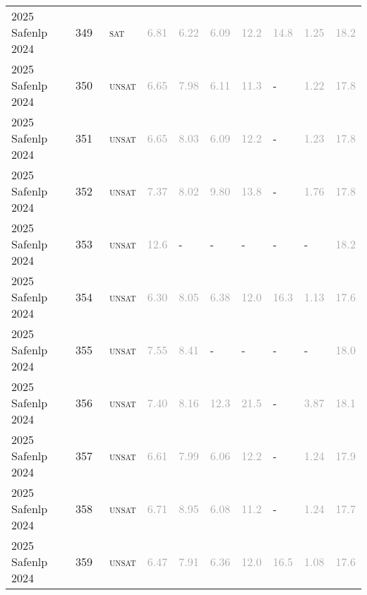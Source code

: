 \begin{center}
{\begin{longtable}{@{}llllllllll@{}}
2025 Safenlp 2024 & 349 & ~\textsc{sat} & \textcolor{darkgray}{6.81} & \textcolor{darkgray}{6.22} & \textcolor{darkgray}{6.09} & \textcolor{darkgray}{12.2} & \textcolor{darkgray}{14.8} & \textcolor{darkgray}{1.25} & \textcolor{darkgray}{18.2} \\
2025 Safenlp 2024 & 350 & ~\textsc{unsat} & \textcolor{darkgray}{6.65} & \textcolor{darkgray}{7.98} & \textcolor{darkgray}{6.11} & \textcolor{darkgray}{11.3} & - & \textcolor{darkgray}{1.22} & \textcolor{darkgray}{17.8} \\
2025 Safenlp 2024 & 351 & ~\textsc{unsat} & \textcolor{darkgray}{6.65} & \textcolor{darkgray}{8.03} & \textcolor{darkgray}{6.09} & \textcolor{darkgray}{12.2} & - & \textcolor{darkgray}{1.23} & \textcolor{darkgray}{17.8} \\
2025 Safenlp 2024 & 352 & ~\textsc{unsat} & \textcolor{darkgray}{7.37} & \textcolor{darkgray}{8.02} & \textcolor{darkgray}{9.80} & \textcolor{darkgray}{13.8} & - & \textcolor{darkgray}{1.76} & \textcolor{darkgray}{17.8} \\
2025 Safenlp 2024 & 353 & ~\textsc{unsat} & \textcolor{darkgray}{12.6} & - & - & - & - & - & \textcolor{darkgray}{18.2} \\
2025 Safenlp 2024 & 354 & ~\textsc{unsat} & \textcolor{darkgray}{6.30} & \textcolor{darkgray}{8.05} & \textcolor{darkgray}{6.38} & \textcolor{darkgray}{12.0} & \textcolor{darkgray}{16.3} & \textcolor{darkgray}{1.13} & \textcolor{darkgray}{17.6} \\
2025 Safenlp 2024 & 355 & ~\textsc{unsat} & \textcolor{darkgray}{7.55} & \textcolor{darkgray}{8.41} & - & - & - & - & \textcolor{darkgray}{18.0} \\
2025 Safenlp 2024 & 356 & ~\textsc{unsat} & \textcolor{darkgray}{7.40} & \textcolor{darkgray}{8.16} & \textcolor{darkgray}{12.3} & \textcolor{darkgray}{21.5} & - & \textcolor{darkgray}{3.87} & \textcolor{darkgray}{18.1} \\
2025 Safenlp 2024 & 357 & ~\textsc{unsat} & \textcolor{darkgray}{6.61} & \textcolor{darkgray}{7.99} & \textcolor{darkgray}{6.06} & \textcolor{darkgray}{12.2} & - & \textcolor{darkgray}{1.24} & \textcolor{darkgray}{17.9} \\
2025 Safenlp 2024 & 358 & ~\textsc{unsat} & \textcolor{darkgray}{6.71} & \textcolor{darkgray}{8.95} & \textcolor{darkgray}{6.08} & \textcolor{darkgray}{11.2} & - & \textcolor{darkgray}{1.24} & \textcolor{darkgray}{17.7} \\
2025 Safenlp 2024 & 359 & ~\textsc{unsat} & \textcolor{darkgray}{6.47} & \textcolor{darkgray}{7.91} & \textcolor{darkgray}{6.36} & \textcolor{darkgray}{12.0} & \textcolor{darkgray}{16.5} & \textcolor{darkgray}{1.08} & \textcolor{darkgray}{17.6} \\

\end{longtable}}
\end{center}
